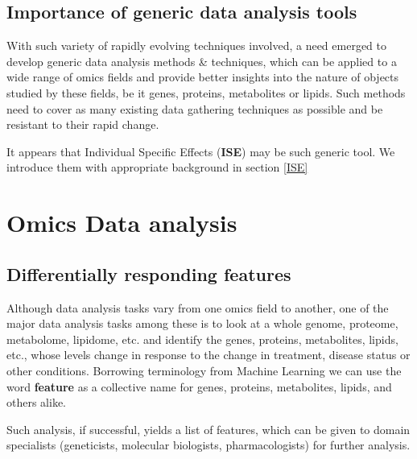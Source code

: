 \subsection{Importance of generic data analysis tools}

With such variety of rapidly evolving techniques involved, a need emerged to develop generic data analysis methods \& techniques, which can be applied to a wide range of omics fields and provide better insights into the nature of objects studied by these fields, be it genes, proteins, metabolites or lipids. Such methods need to cover as many existing data gathering techniques as possible and be resistant to their rapid change.

It appears that Individual Specific Effects (\textbf{ISE}) may be such generic tool. We introduce them with appropriate background in section 
\ref{ISE}

\section{Omics Data analysis}

\subsection{Differentially responding features}

Although data analysis tasks vary from one omics field to another, one of the major data analysis tasks among these is to look at a whole genome, proteome, metabolome, lipidome, etc. and identify the genes, proteins, metabolites, lipids, etc., whose levels change in response to the change in treatment, disease status or other conditions. Borrowing terminology from Machine Learning we can use the word \textbf{feature} as a collective name for genes, proteins, metabolites, lipids, and others alike.

Such analysis, if successful, yields a list of features, which can be given to domain specialists (geneticists, molecular biologists, pharmacologists) for further analysis.


